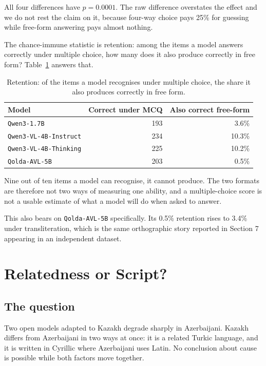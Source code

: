 \documentclass[final]{clv2025}
\begin{document}
All four differences have $p = 0.0001$. The raw difference overstates the
effect and we do not rest the claim on it, because four-way choice pays 25\%
for guessing while free-form answering pays almost nothing.

The chance-immune statistic is retention: among the items a model answers
correctly under multiple choice, how many does it also produce correctly in
free form? Table~\ref{tab:retention} answers that.

\begin{table}[h!]
\caption{Retention: of the items a model recognises under multiple choice, the
share it also produces correctly in free form.}
\label{tab:retention}
\centering
\begin{tabular}{lrr}
\toprule
Model & Correct under MCQ & Also correct free-form \\
\midrule
\texttt{Qwen3-1.7B} & 193 & 3.6\% \\
\texttt{Qwen3-VL-4B-Instruct} & 234 & 10.3\% \\
\texttt{Qwen3-VL-4B-Thinking} & 225 & 10.2\% \\
\texttt{Qolda-AVL-5B} & 203 & 0.5\% \\
\bottomrule
\end{tabular}
\end{table}

Nine out of ten items a model can recognise, it cannot produce. The two formats
are therefore not two ways of measuring one ability, and a multiple-choice
score is not a usable estimate of what a model will do when asked to answer.

This also bears on \texttt{Qolda-AVL-5B} specifically. Its 0.5\% retention
rises to 3.4\% under transliteration, which is the same orthographic story
reported in Section 7 appearing in an independent dataset.

\section{Relatedness or Script?}

\subsection{The question}

Two open models adapted to Kazakh degrade sharply in Azerbaijani. Kazakh
differs from Azerbaijani in two ways at once: it is a related Turkic language,
and it is written in Cyrillic where Azerbaijani uses Latin. No conclusion about
cause is possible while both factors move together.
\end{document}
